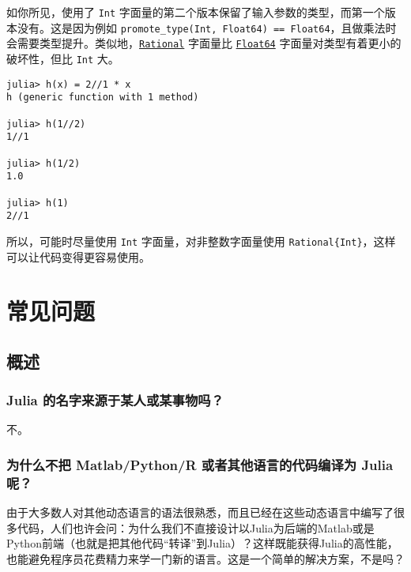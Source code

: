 如你所见，使用了 \texttt{Int} 字面量的第二个版本保留了输入参数的类型，而第一个版本没有。这是因为例如 \texttt{promote\_type(Int, Float64) == Float64}，且做乘法时会需要类型提升。类似地，\hyperlink{8304566144531167610}{\texttt{Rational}} 字面量比 \hyperlink{5027751419500983000}{\texttt{Float64}} 字面量对类型有着更小的破坏性，但比 \texttt{Int} 大。




\begin{verbatim}
julia> h(x) = 2//1 * x
h (generic function with 1 method)

julia> h(1//2)
1//1

julia> h(1/2)
1.0

julia> h(1)
2//1
\end{verbatim}



所以，可能时尽量使用 \texttt{Int} 字面量，对非整数字面量使用 \texttt{Rational\{Int\}}，这样可以让代码变得更容易使用。



\hypertarget{17031291324185486008}{}


\chapter{常见问题}



\hypertarget{2697217483973683039}{}


\section{概述}



\hypertarget{6343873710843101538}{}


\subsection{Julia 的名字来源于某人或某事物吗？}



不。



\hypertarget{13041261795977380154}{}


\subsection{为什么不把 Matlab/Python/R 或者其他语言的代码编译为 Julia 呢？}



由于大多数人对其他动态语言的语法很熟悉，而且已经在这些动态语言中编写了很多代码，人们也许会问：为什么我们不直接设计以Julia为后端的Matlab或是Python前端（也就是把其他代码“转译”到Julia）？这样既能获得Julia的高性能，也能避免程序员花费精力来学一门新的语言。这是一个简单的解决方案，不是吗？



